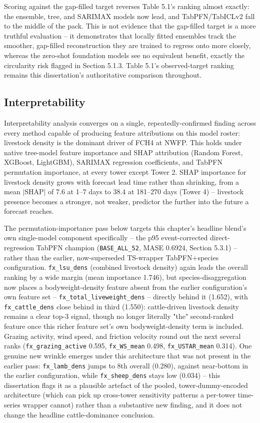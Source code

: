Scoring against the gap-filled target reverses Table 5.1's ranking almost exactly: the ensemble,
tree, and SARIMAX models now lead, and TabPFN/TabICLv2 fall to the middle of the pack. This is not
evidence that the gap-filled target is a more truthful evaluation -- it demonstrates that locally
fitted ensembles track the smoother, gap-filled reconstruction they are trained to regress onto more
closely, whereas the zero-shot foundation models see no equivalent benefit, exactly the circularity
risk flagged in Section 5.1.3. Table 5.1's observed-target ranking remains this dissertation's
authoritative comparison throughout.

\subsection{Interpretability}

Interpretability analysis converges on a single, repeatedly-confirmed finding across every method
capable of producing feature attributions on this model roster: livestock density is the dominant
driver of FCH4 at NWFP. This holds under native tree-model feature importance and SHAP attribution
(Random Forest, XGBoost, LightGBM), SARIMAX regression coefficients, and TabPFN permutation
importance, at every tower except Tower 2. SHAP importance for livestock density
grows with forecast lead time rather than shrinking, from a mean $|\text{SHAP}|$ of 7.6 at 1--7 days
to 38.4 at 181--270 days (Tower 4) -- livestock presence becomes a stronger, not weaker, predictor
the further into the future a forecast reaches.

The permutation-importance pass below targets this chapter's headline blend's own single-model
component specifically -- the p95 event-corrected direct-regression TabPFN champion
(\texttt{BASE\_ALL\_52}, MASE 0.6924, Section 5.3.1) -- rather than the earlier, now-superseded
TS-wrapper TabPFN+species configuration. \texttt{fx\_lsu\_dens} (combined livestock density) again
leads the overall ranking by a wide margin (mean importance 1.746), but species-disaggregation now
places a bodyweight-density feature absent from the earlier configuration's own feature
set -- \texttt{fx\_total\_liveweight\_dens} -- directly behind it (1.652), with \texttt{fx\_cattle\_dens}
close behind in third (1.550): cattle-driven livestock density remains a clear top-3 signal, though
no longer literally "the" second-ranked feature once this richer feature set's own bodyweight-density
term is included. Grazing activity, wind speed, and friction velocity round out the next several
ranks (\texttt{fx\_grazing\_active} 0.595, \texttt{fx\_WS\_mean} 0.498, \texttt{fx\_USTAR\_mean}
0.314). One genuine new wrinkle emerges under this architecture that was not present in the earlier
pass: \texttt{fx\_lamb\_dens} jumps to 8th overall (0.280), against near-bottom in the earlier
configuration, while \texttt{fx\_sheep\_dens} stays low (0.034) -- this dissertation flags it as a
plausible artefact of the pooled, tower-dummy-encoded architecture (which can pick up cross-tower
sensitivity patterns a per-tower time-series wrapper cannot) rather than a substantive new finding,
and it does not change the headline cattle-dominance conclusion.

